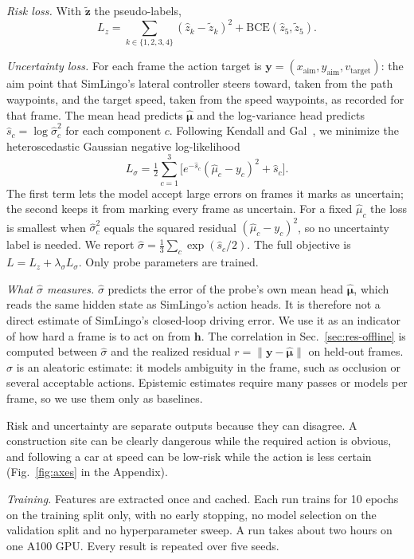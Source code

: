 \documentclass[conference]{IEEEtran}
\newcommand{\sighat}{\hat{\sigma}}
\begin{document}
\emph{Risk loss.} With $\tilde{\mathbf{z}}$ the pseudo-labels,
\begin{equation}
L_z=\sum_{k\in\{1,2,3,4\}}(\hat z_k-\tilde z_k)^2+\mathrm{BCE}(\hat z_5,\tilde z_5).
\end{equation}

\emph{Uncertainty loss.} For each frame the action target is
$\mathbf{y}=(x_{\mathrm{aim}},y_{\mathrm{aim}},v_{\mathrm{target}})$: the aim point
that SimLingo's lateral controller steers toward, taken from the path waypoints, and
the target speed, taken from the speed waypoints, as recorded for that frame. The
mean head predicts $\hat{\boldsymbol\mu}$ and the log-variance head predicts
$\hat s_c=\log\sighat_c^2$ for each component $c$. Following Kendall and
Gal~\cite{kendall2017uncertainties}, we minimize the heteroscedastic Gaussian
negative log-likelihood
\begin{equation}
L_\sigma=\tfrac12\sum_{c=1}^{3}\Big[e^{-\hat s_c}(\hat\mu_c-y_c)^2+\hat s_c\Big].
\end{equation}
The first term lets the model accept large errors on frames it marks as uncertain;
the second keeps it from marking every frame as uncertain. For a fixed
$\hat\mu_c$ the loss is smallest when $\sighat_c^2$ equals the squared residual
$(\hat\mu_c-y_c)^2$, so no uncertainty label is needed. We report
$\sighat=\frac13\sum_c\exp(\hat s_c/2)$. The full objective is
$L=L_z+\lambda_\sigma L_\sigma$. Only probe parameters are trained.

\emph{What $\sighat$ measures.} $\sighat$ predicts the error of the probe's own
mean head $\hat{\boldsymbol\mu}$, which reads the same hidden state as SimLingo's
action heads. It is therefore not a direct estimate of SimLingo's closed-loop driving
error. We use it as an indicator of how hard a frame is to act on from
$\mathbf{h}$. The correlation in Sec.~\ref{sec:res-offline} is computed between
$\sighat$ and the realized residual $r=\lVert\mathbf{y}-\hat{\boldsymbol\mu}\rVert$
on held-out frames. $\sighat$ is an aleatoric estimate: it models ambiguity in the
frame, such as occlusion or several acceptable actions. Epistemic estimates require
many passes or models per frame, so we use them only as baselines.

Risk and uncertainty are separate outputs because they can disagree. A construction
site can be clearly dangerous while the required action is obvious, and following a
car at speed can be low-risk while the action is less certain
(Fig.~\ref{fig:axes} in the Appendix).

\emph{Training.} Features are extracted once and cached. Each run trains for 10
epochs on the training split only, with no early stopping, no model selection on the
validation split and no hyperparameter sweep. A run takes about two hours on one
A100 GPU. Every result is repeated over five seeds.
\end{document}
